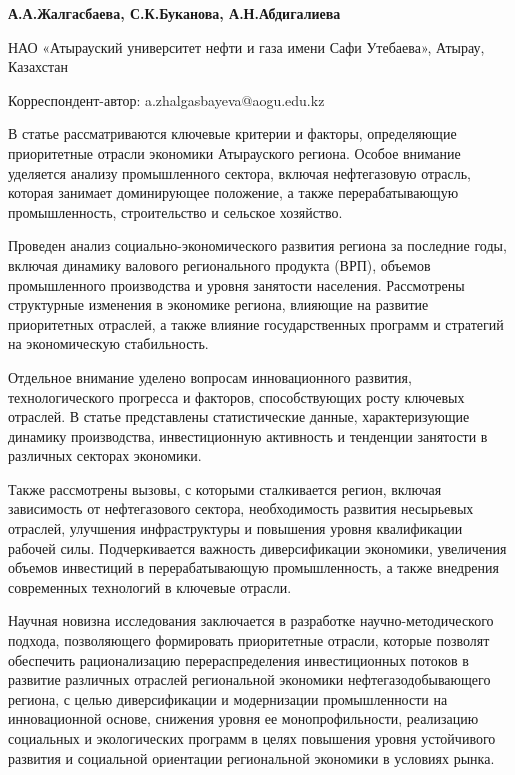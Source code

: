 
\begin{articleheader}

{\bfseries
А.А.Жалгасбаева\textsuperscript{\envelope },
С.К.Буканова,
А.Н.Абдигалиева
}
\end{articleheader}

\begin{affiliation}
НАО «Атырауский университет нефти и газа имени Сафи Утебаева», Атырау, Казахстан

\textsuperscript{\envelope }Корреспондент-автор: a.zhalgasbayeva@aogu.edu.kz
\end{affiliation}

В статье рассматриваются ключевые критерии и факторы, определяющие
приоритетные отрасли экономики Атырауского региона. Особое внимание
уделяется анализу промышленного сектора, включая нефтегазовую отрасль,
которая занимает доминирующее положение, а также перерабатывающую
промышленность, строительство и сельское хозяйство.

Проведен анализ социально-экономического развития региона за последние
годы, включая динамику валового регионального продукта (ВРП), объемов
промышленного производства и уровня занятости населения. Рассмотрены
структурные изменения в экономике региона, влияющие на развитие
приоритетных отраслей, а также влияние государственных программ и
стратегий на экономическую стабильность.

Отдельное внимание уделено вопросам инновационного развития,
технологического прогресса и факторов, способствующих росту ключевых
отраслей. В статье представлены статистические данные, характеризующие
динамику производства, инвестиционную активность и тенденции занятости в
различных секторах экономики.

Также рассмотрены вызовы, с которыми сталкивается регион, включая
зависимость от нефтегазового сектора, необходимость развития несырьевых
отраслей, улучшения инфраструктуры и повышения уровня квалификации
рабочей силы. Подчеркивается важность диверсификации экономики,
увеличения объемов инвестиций в перерабатывающую промышленность, а также
внедрения современных технологий в ключевые отрасли.

Научная новизна исследования заключается в разработке
научно-методического подхода, позволяющего формировать приоритетные
отрасли, которые позволят обеспечить рационализацию перераспределения
инвестиционных потоков в развитие различных отраслей региональной
экономики нефтегазодобывающего региона, с целью диверсификации и
модернизации промышленности на инновационной основе, снижения уровня ее
монопрофильности, реализацию социальных и экологических программ в целях
повышения уровня устойчивого развития и социальной ориентации
региональной экономики в условиях рынка.

